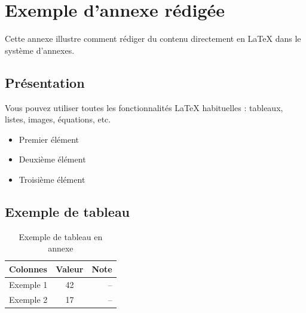 
\chapter{Exemple d'annexe rédigée}

Cette annexe illustre comment rédiger du contenu directement en \LaTeX{} dans le système d'annexes.

\section*{Présentation}

Vous pouvez utiliser toutes les fonctionnalités LaTeX habituelles : tableaux, listes, images, équations, etc.

\begin{itemize}
    \item Premier élément
    \item Deuxième élément
    \item Troisième élément
\end{itemize}

\section*{Exemple de tableau}

\begin{table}[h]
    \centering
    \begin{tabular}{|l|c|r|}
        \hline
        \textbf{Colonnes} & \textbf{Valeur} & \textbf{Note} \\
        \hline
        Exemple 1         & 42              & --            \\
        Exemple 2         & 17              & --            \\
        \hline
    \end{tabular}
    \caption{Exemple de tableau en annexe}
    \label{tab:exemple-annexe}
\end{table}


